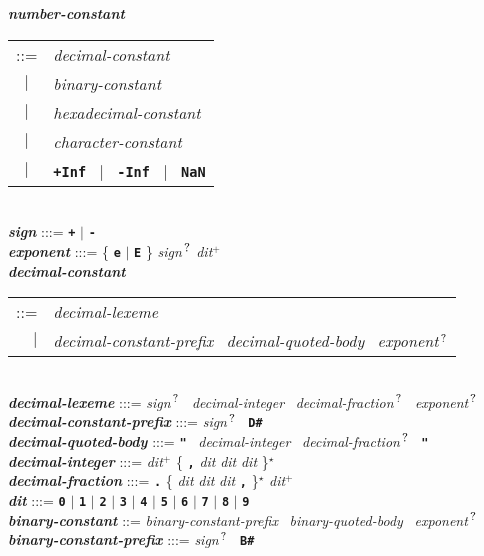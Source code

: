 \documentclass[12pt]{article}
\newcommand{\TT}[1]{{\tt \bfseries #1}}
\newcommand{\STAR}{{\Large $^\star$}}
\newcommand{\PLUS}[1][]{{$^{+#1}$}}
\newcommand{\QMARK}{{$^{\,\mbox{\footnotesize ?}}$}}
\newcommand{\ttkey}[1]{{\tt \bfseries #1}}
\newcommand{\emkey}[1]{{\em \bfseries #1}}
\newenvironment{indpar}[1][0.3in]%
	{\begin{list}{}%
		     {\setlength{\itemsep}{0in}%
		      \setlength{\topsep}{0in}%
		      \setlength{\parsep}{1ex}%
		      \setlength{\labelwidth}{#1}%
		      \setlength{\leftmargin}{#1}%
		      \addtolength{\leftmargin}{\labelsep}}%
	 \item}%
	{\end{list}}
\begin{document}
\begin{indpar}
\emkey{number-constant}\label{NUMBER-CONSTANT}
    \begin{tabular}[t]{@{}cl}
    ::= & {\em decimal-constant} \\
    $|$ & {\em binary-constant} \\
    $|$ & {\em hexadecimal-constant} \\
    $|$ & {\em character-constant} \\
    $|$ & \TT{+Inf}
          ~$|$~ \TT{-Inf}
          ~$|$~ \ttkey{NaN}
    \end{tabular}
\\[0.5ex]
\emkey{sign} :::= \TT{+} $|$ \TT{-} \\
\emkey{exponent} :::=
	\{ \TT{e} $|$ \TT{E} \} {\em sign}\QMARK{} {\em dit}\PLUS{}
\\[0.5ex]
\emkey{decimal-constant} \begin{tabular}[t]{@{}rl@{}}
                         ::= & {\em decimal-lexeme} \\
			 $|$ & {\em decimal-constant-prefix}~
			       {\em decimal-quoted-body}~
			       {\em exponent}\QMARK{}
			 \end{tabular}
\\[0.5ex]
\emkey{decimal-lexeme} :::= {\em sign}\QMARK{}~ {\em decimal-integer}~
			    {\em decimal-fraction}\QMARK{}~
                            {\em exponent}\QMARK{}
\\[0.5ex]
\emkey{decimal-constant-prefix} :::= {\em sign}\QMARK{}~ \TT{D\#}
\\[0.5ex]
\emkey{decimal-quoted-body} :::= \TT{"}~ {\em decimal-integer}~
				 {\em decimal-fraction}\QMARK{}~ \TT{"}
\\[0.5ex]
\emkey{decimal-integer}
    :::= {\em dit}\PLUS{} 
         \{ \TT{,} {\em dit} {\em dit} {\em dit} \}\STAR{} \\
\emkey{decimal-fraction} :::=
    \TT{.} \{ {\em dit} {\em dit} {\em dit} \TT{,} \}\STAR{}
           {\em dit}\PLUS{} \\
\emkey{dit}\label{DIT}
	:::= \TT{0} $|$ \TT{1} $|$ \TT{2} $|$ \TT{3} $|$ \TT{4}
                    $|$ \TT{5} $|$ \TT{6} $|$ \TT{7} $|$ \TT{8} $|$ \TT{9}
 \\[0.5ex]
\emkey{binary-constant} ::= {\em binary-constant-prefix}~
                              {\em binary-quoted-body}~
			      {\em exponent}\QMARK{}
\\[0.5ex]
\emkey{binary-constant-prefix} :::= {\em sign}\QMARK{}~ \TT{B\#}
\\[0.5ex]

\end{indpar}
\end{document}
